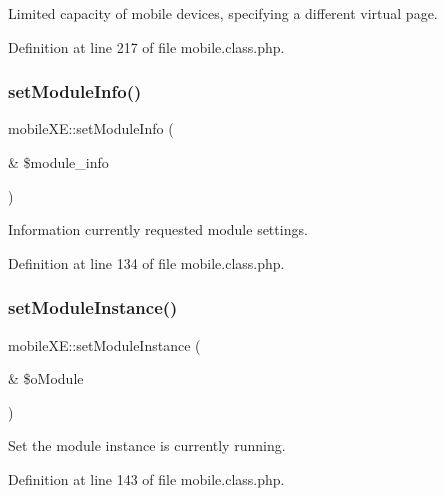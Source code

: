 Limited capacity of mobile devices, specifying a different virtual page. 



Definition at line 217 of file mobile.\+class.\+php.

\mbox{\label{classmobileXE_a33d31bb2b41bb776645c36460644823c}} 
\subsubsection{\texorpdfstring{set\+Module\+Info()}{setModuleInfo()}}
{\footnotesize\ttfamily mobile\+X\+E\+::set\+Module\+Info (\begin{DoxyParamCaption}\item[{\&}]{\$module\+\_\+info }\end{DoxyParamCaption})}



Information currently requested module settings. 



Definition at line 134 of file mobile.\+class.\+php.

\mbox{\label{classmobileXE_af8c7a30ab2c9f7dced6b8aa7ace649b1}} 
\subsubsection{\texorpdfstring{set\+Module\+Instance()}{setModuleInstance()}}
{\footnotesize\ttfamily mobile\+X\+E\+::set\+Module\+Instance (\begin{DoxyParamCaption}\item[{\&}]{\$o\+Module }\end{DoxyParamCaption})}



Set the module instance is currently running. 



Definition at line 143 of file mobile.\+class.\+php.

\mbox{\label{classmobileXE_a6c9c99c3df5a9345485026c74a796287}} 

